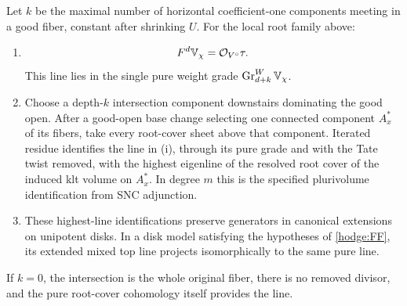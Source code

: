 \begin{proposition}
\label{hodge:residue}
Let \(k\) be the maximal number of horizontal coefficient-one
components meeting in a good fiber, constant after shrinking \(U\).
For the local root family above:
\begin{enumerate}[label=\textup{(\roman*)}]
\item
\[
                   F^d\mathbb V_\chi=\mathcal O_{V^\circ}\tau.
\]
This line lies in the single pure weight grade
\(\operatorname{Gr}^W_{d+k}\mathbb V_\chi\).
\item
Choose a depth-\(k\) intersection component downstairs dominating
the good open.  After a good-open base change selecting one
connected component \(A_x^*\) of its fibers, take every root-cover
sheet above that component.  Iterated residue identifies the line
in \textup{(i)}, through its pure grade and with the Tate twist
removed, with the highest eigenline of the resolved root cover of
the induced klt volume on \(A_x^*\).  In degree \(m\) this is the
specified plurivolume identification from SNC adjunction.
\item
These highest-line identifications preserve generators in
canonical extensions on unipotent disks.  In a disk model satisfying
the hypotheses of \eqref{hodge:FF}, its extended mixed top line
projects isomorphically to the same pure line.
\end{enumerate}
If \(k=0\), the intersection is the whole original fiber, there is
no removed divisor, and the pure root-cover cohomology itself
provides the line.
\end{proposition}

